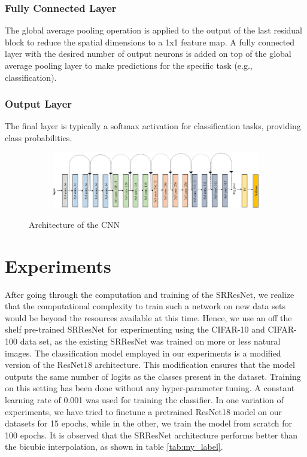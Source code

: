 \documentclass[10pt,twocolumn,letterpaper]{article}
\begin{document}
\subsubsection{Fully Connected Layer}
The global average pooling operation is applied to the output of the last residual block to reduce the spatial dimensions to a 1x1 feature map. A fully connected layer with the desired number of output neurons is added on top of the global average pooling layer to make predictions for the specific task (e.g., classification).

\subsubsection{Output Layer}
The final layer is typically a softmax activation for classification tasks, providing class probabilities.

\begin{figure}
    \centering
    \begin{subfigure}{0.5\textwidth}
        \includegraphics[width=\linewidth]{ResNet18 - 1.png}
    \end{subfigure}
    \caption{Architecture of the CNN}
    \label{fig:enter-label}
\end{figure}

\section{Experiments}
After going through the computation and training of the SRResNet, we realize that the computational complexity to train such a network on new data sets would be beyond the resources available at this time. Hence, we use an off the shelf pre-trained SRResNet for experimenting using the CIFAR-10 and CIFAR-100 data set, as the existing SRResNet was trained on more or less natural images.
The classification model employed in our experiments is a modified version of the ResNet18 architecture. This modification ensures that the model outputs the same number of logits as the classes present in the dataset.
Training on this setting has been done without any hyper-parameter tuning. A constant learning rate of 0.001 was used for training the classifier. In one variation of experiments, we have tried to finetune a pretrained ResNet18 model on our datasets for 15 epochs, while in the other, we train the model from scratch for 100 epochs. It is observed that the SRResNet architecture performs better than the bicubic interpolation, as shown in table \ref{tab:my_label}.
\end{document}
